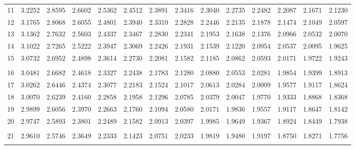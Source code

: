 {\begin{tabular}{l|lllllllllllll}
\\ 
 11 & 3.2252 & 2.8595 & 2.6602 & 2.5362 & 2.4512 & 2.3891 & 2.3416 & 2.3040 & 2.2735 & 2.2482 & 2.2087 & 2.1671 & 2.1230 \\[5pt] \arrayrulecolor{light-gray}\hline\arrayrulecolor{black}  
 12 & 3.1765 & 2.8068 & 2.6055 & 2.4801 & 2.3940 & 2.3310 & 2.2828 & 2.2446 & 2.2135 & 2.1878 & 2.1474 & 2.1049 & 2.0597 \\[5pt] \arrayrulecolor{light-gray}\hline\arrayrulecolor{black}  
 13 & 3.1362 & 2.7632 & 2.5603 & 2.4337 & 2.3467 & 2.2830 & 2.2341 & 2.1953 & 2.1638 & 2.1376 & 2.0966 & 2.0532 & 2.0070 \\[5pt] \arrayrulecolor{light-gray}\hline\arrayrulecolor{black}  
 14 & 3.1022 & 2.7265 & 2.5222 & 2.3947 & 2.3069 & 2.2426 & 2.1931 & 2.1539 & 2.1220 & 2.0954 & 2.0537 & 2.0095 & 1.9625 \\[5pt] \arrayrulecolor{light-gray}\hline\arrayrulecolor{black}  
 15 & 3.0732 & 2.6952 & 2.4898 & 2.3614 & 2.2730 & 2.2081 & 2.1582 & 2.1185 & 2.0862 & 2.0593 & 2.0171 & 1.9722 & 1.9243 \\[5pt] \arrayrulecolor{light-gray}\hline\arrayrulecolor{black}  
\\ 
 16 & 3.0481 & 2.6682 & 2.4618 & 2.3327 & 2.2438 & 2.1783 & 2.1280 & 2.0880 & 2.0553 & 2.0281 & 1.9854 & 1.9399 & 1.8913 \\[5pt] \arrayrulecolor{light-gray}\hline\arrayrulecolor{black}  
 17 & 3.0262 & 2.6446 & 2.4374 & 2.3077 & 2.2183 & 2.1524 & 2.1017 & 2.0613 & 2.0284 & 2.0009 & 1.9577 & 1.9117 & 1.8624 \\[5pt] \arrayrulecolor{light-gray}\hline\arrayrulecolor{black}  
 18 & 3.0070 & 2.6239 & 2.4160 & 2.2858 & 2.1958 & 2.1296 & 2.0785 & 2.0379 & 2.0047 & 1.9770 & 1.9333 & 1.8868 & 1.8368 \\[5pt] \arrayrulecolor{light-gray}\hline\arrayrulecolor{black}  
 19 & 2.9899 & 2.6056 & 2.3970 & 2.2663 & 2.1760 & 2.1094 & 2.0580 & 2.0171 & 1.9836 & 1.9557 & 1.9117 & 1.8647 & 1.8142 \\[5pt] \arrayrulecolor{light-gray}\hline\arrayrulecolor{black}  
 20 & 2.9747 & 2.5893 & 2.3801 & 2.2489 & 2.1582 & 2.0913 & 2.0397 & 1.9985 & 1.9649 & 1.9367 & 1.8924 & 1.8449 & 1.7938 \\[5pt] \arrayrulecolor{light-gray}\hline\arrayrulecolor{black}  
\\ 
 21 & 2.9610 & 2.5746 & 2.3649 & 2.2333 & 2.1423 & 2.0751 & 2.0233 & 1.9819 & 1.9480 & 1.9197 & 1.8750 & 1.8271 & 1.7756 \\[5pt] \arrayrulecolor{light-gray}\hline\arrayrulecolor{black}  

\end{tabular}}

